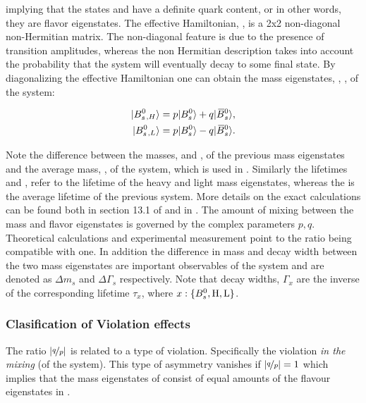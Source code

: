 \noindent implying that the states \Bs and \Bsb have a definite quark content, or in other words,
they are flavor eigenstates. The effective Hamiltonian, \Heff, is a 2x2 non-diagonal non-Hermitian matrix.
The non-diagonal feature is due to the presence of \BBbarSyst transition amplitudes,
whereas the non Hermitian description takes into account the probability that the system will
eventually decay to some final state. By diagonalizing the effective Hamiltonian one can obtain
the mass eigenstates, , , of the system:

\begin{align}
  \centering
  \ket{\BsH} &= p \ket{\Bs} + q \ket{\Bsb}, \nonumber \\
  \ket{\BsL} &= p \ket{\Bs} - q \ket{\Bsb}.
  \label{bs_mass_eigen}
\end{align}

\noindent Note the difference between the masses, \mass{\BsH} and \mass{\BsL}, of the previous mass
eigenstates and the average mass, \mass{\Bs}, of the \BBbarSyst system, which is used in .
Similarly the lifetimes \tauH and \tauL, refer to the lifetime of the heavy and light mass eigenstates, whereas
the \tauBs is the average lifetime of the previous system. More details on the exact calculations can be found both in section 13.1
of \cite{PDG} and in \cite{jeroenThesis,DeBruyn-thesis}. The amount of mixing between the mass
and flavor eigenstates is governed by the complex parameters $p,q$.
Theoretical calculations \cite{Lenz:2011ti} and experimental measurement \cite{asl-paper} point to the ratio
\qoverp being compatible with one. In addition the difference in mass and decay width between the two mass
eigenstates are important observables of the \BBbarSyst system and are denoted as $\Delta m_s$ and $\Delta\Gamma_s$
respectively. Note that decay widths, $\Gamma_x$ are the inverse of the corresponding lifetime $\tau_x$, where $x:\{B^0_s,{\rm H},{\rm L}\}$.

\subsubsection{Clasification of \CP Violation effects}
The ratio $|\nicefrac{q}{p}|$ is related to a type of \CP violation. Specifically the \CP violation {\it in the mixing}
(of the \BBbarSyst system). This type of \CP asymmetry vanishes if $|\nicefrac{q}{p}|= 1$ which implies that the mass
eigenstates of  consist of equal amounts of the flavour eigenstates in .

